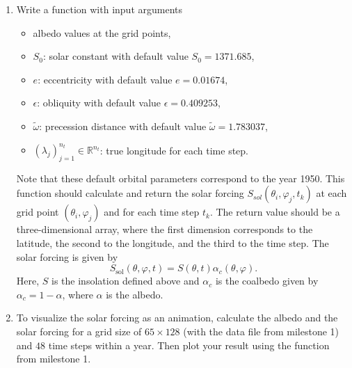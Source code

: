 \documentclass[10pt]{scrartcl}
\newcommand{\lat}{\theta}
\begin{document}
\begin{enumerate}
\item[5.] Write a function \small\texttt{} \normalsize with input arguments
\begin{itemize}
	\item albedo values at the grid points,
	\item $S_0$: solar constant with default value $S_0 = 1371.685$,
	\item $e$: eccentricity with default value $e = 0.01674$,
	\item $\epsilon$: obliquity with default value $\epsilon  = 0.409253$,
	\item $\tilde \omega$: precession distance with default value $\tilde \omega = 1.783037$,
	\item $\left(\lambda_j\right)_{j = 1}^{n_t} \in \mathbb{R}^{n_t}$: true longitude for each time step.
\end{itemize}

Note that these default orbital parameters correspond to the year 1950.
This function should calculate and return the solar forcing $S_{sol}(\lat_i,\varphi_j,t_k)$ at each grid point $(\lat_i, \varphi_j)$ and for each time step $t_k$.
The return value should be a three-dimensional array, where the first dimension corresponds to the latitude, the second to the longitude, and the third to the time step.
The solar forcing is given by
\begin{equation*}
	S_\text{sol}\left(\lat,\varphi,t\right) = S\left(\lat,t\right)\alpha_c\left(\lat,\varphi\right).
\end{equation*}
Here, $S$ is the insolation defined above and $\alpha_c$ is the coalbedo given by $\alpha_c = 1 - \alpha$, where $\alpha$ is the albedo.


\item[6.] To visualize the solar forcing as an animation, calculate the albedo and the solar forcing for a grid size of $65 \times 128$ (with the data file from milestone 1) and $48$ time steps within a year. Then plot your result using the function
\small\texttt{} \normalsize from milestone 1.


\end{enumerate}
\end{document}
